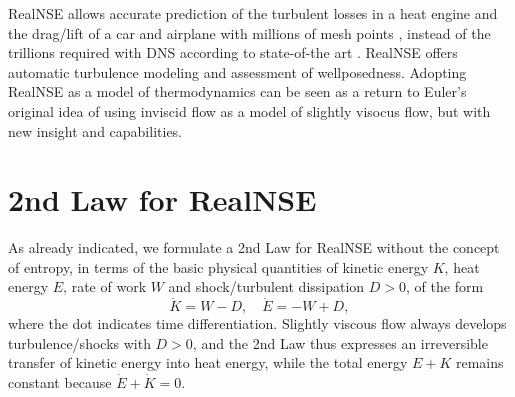 RealNSE allows accurate prediction of
the turbulent losses in a heat engine and 
the drag/lift of a car and airplane with millions of mesh
points \cite{car,airplane}, instead of the trillions required 
with DNS according to state-of-the
art \cite{moin}. RealNSE offers automatic turbulence modeling and assessment 
of wellposedness. Adopting RealNSE as a model of thermodynamics 
can be seen as a return to Euler's original idea of using inviscid flow
as a model of slightly visocus flow, but with new insight
and capabilities.


 


    


    




\section{2nd Law for RealNSE}

As already indicated, we formulate a 2nd Law for RealNSE 
without the concept of entropy, in terms of  
the basic physical quantities of kinetic energy
$K$, heat energy $E$, rate of work $W$ and shock/turbulent dissipation
$D>0$,  of the form
\begin{equation}\label{secondlaw2}
\dot K=W-D,\quad \dot E=-W+D,
\end{equation}
where the dot indicates time differentiation. Slightly viscous
flow always develops turbulence/shocks with $D>0$, and the  
2nd Law thus expresses an irreversible transfer of kinetic energy
into heat energy, while the total energy $E+K$ remains constant
because $\dot E+\dot K=0$. 


